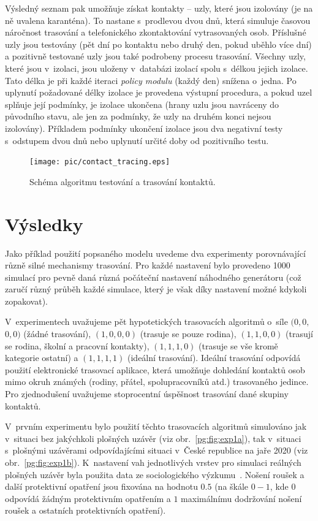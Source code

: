 Výsledný seznam pak umožňuje získat kontakty -- uzly, které jsou izolovány (je na
ně uvalena karanténa). To nastane s~prodlevou dvou dnů, která simuluje časovou
náročnost trasování a telefonického zkontaktování vytrasovaných osob.
Příslušné uzly jsou testovány (pět dní po kontaktu nebo druhý den, pokud uběhlo
více dní) a pozitivně testované uzly jsou také podrobeny procesu trasování. 
Všechny uzly, které jsou v~izolaci, jsou uloženy v~databázi izolací spolu s~délkou
jejich izolace. Tato délka je při každé iteraci {\em policy modulu} (každý den)
snížena o~jedna. Po uplynutí požadované délky izolace je provedena výstupní
procedura, a pokud uzel splňuje její podmínky, je izolace ukončena (hrany uzlu
jsou navráceny do původního stavu, ale jen za podmínky, že uzly na druhém konci
nejsou izolovány). Příkladem podmínky ukončení izolace jsou dva negativní testy
s~odstupem dvou dnů nebo uplynutí určité doby od pozitivního testu.


\begin{figure}[ht]
  \centering \texttt{[image: pic/contact\_tracing.eps]}
  \caption{Schéma algoritmu testování a trasování kontaktů.}
  \label{pg:fig:ct}
\end{figure}




\section*{Výsledky}
Jako příklad použití popsaného modelu uvedeme dva experimenty porovnávající
různě silné mechanismy trasování. Pro každé nastavení bylo provedeno 1000
simulací pro pevně daná různá počáteční nastavení náhodného
generátoru (což zaručí různý průběh každé simulace, který je však díky nastavení možné kdykoli zopakovat).

V~experimentech uvažujeme pět hypotetických trasovacích algoritmů
o~sí\-le $(0, 0,$ $ 0, 0)$ (žádné trasování), $(1, 0, 0, 0)$ (trasuje se
pouze rodina), $(1, 1, 0, 0)$ (trasují se rodina, školní a pracovní
kontakty), $(1, 1, 1, 0)$ (trasuje se vše kromě kategorie ostatní) a
$(1, 1, 1, 1)$ (ideální trasování). Ideální trasování odpovídá použití
elektronické trasovací aplikace, která umožňuje dohledání kontaktů
osob mimo okruh známých (rodiny, přátel, spolupracovníků atd.) trasovaného jedince. Pro zjednodušení
uvažujeme stoprocentní úspěšnost trasování dané skupiny kontaktů.

V~prvním experimentu bylo použití těchto trasovacích algoritmů
simulováno jak v~situaci bez jakýchkoli plošných uzávěr (viz
obr.~\ref{pg:fig:exp1a}), tak v~situaci s~plošnými uzávěrami
odpovídajícími situaci v~České republice na jaře 2020 (viz
obr.~\ref{pg:fig:exp1b}). K~nastavení vah jednotlivých vrstev pro
simulaci reálných plošných uzávěr byla použita data ze sociologického
výzkumu~\cite{paqcovid}. Nošení roušek a další protektivní opatření
jsou fixována na hodnotu $0.5$ (na škále $0 - 1$, kde $0$ odpovídá
žádným protektivním opatřením a $1$ maximálnímu dodržování nošení
roušek a ostatních protektivních opatření).

